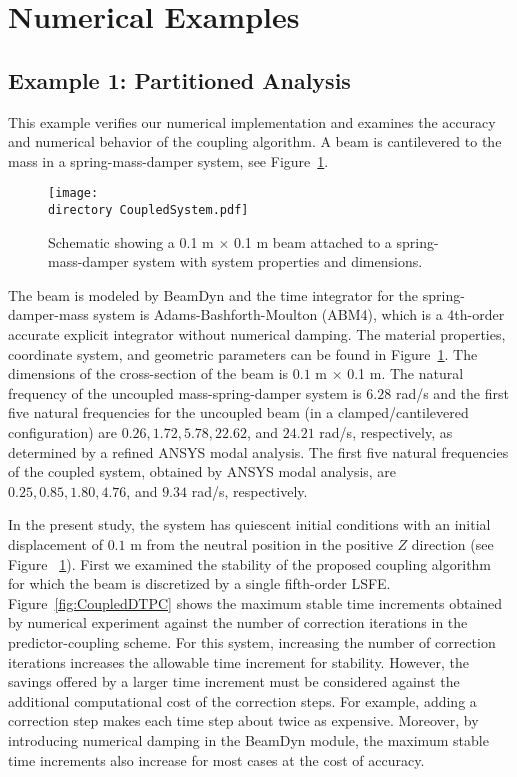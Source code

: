 \documentclass{aiaa-tc}
\def\directory{EPSF/}
\begin{document}
 
\section{Numerical Examples}
 
\subsection{Example 1: Partitioned Analysis}

This example verifies our numerical implementation and examines the accuracy and numerical behavior of the coupling algorithm. A beam is cantilevered to the mass in a spring-mass-damper system, 
see Figure~\ref{fig:CoupledSystem}. 

 \begin{figure}
\centering
\texttt{[image: \\directory CoupledSystem.pdf]}
\caption{Schematic showing a 0.1 m $\times$ 0.1 m beam attached to a spring-mass-damper system with system properties and dimensions.} 
\label{fig:CoupledSystem}
\end{figure}

The beam is modeled by BeamDyn and the time integrator for the spring-damper-mass system is Adams-Bashforth-Moulton (ABM4), which is a 4th-order accurate explicit integrator without numerical damping. 
The material properties, coordinate system, and geometric parameters can be found in Figure~\ref{fig:CoupledSystem}. 
The dimensions of the cross-section of the beam is $0.1$ m $\times$ 0.1 m. 
The natural frequency of the uncoupled mass-spring-damper system is $6.28$ rad/s and the first five natural frequencies for the uncoupled beam (in a clamped/cantilevered configuration) are $0.26, 1.72, 5.78, 22.62$, and $24.21$ rad/s, respectively, as determined by a refined ANSYS modal analysis. 
The first five natural frequencies of the coupled system, obtained by ANSYS modal analysis, are $0.25, 0.85, 1.80, 4.76$, and $9.34$ rad/s, respectively.
 
In the present study, the system has quiescent initial conditions with an initial displacement of $0.1$ m from the neutral position in the positive $Z$ direction (see Figure ~\ref{fig:CoupledSystem}). 
First we examined the stability of the proposed coupling algorithm for which the beam is discretized by a single fifth-order LSFE. 
Figure~\ref{fig:CoupledDTPC} shows the maximum stable time increments obtained by numerical experiment against the number of correction iterations in the predictor-coupling scheme.  
For this system, increasing the number of correction iterations increases the allowable time increment for stability.  However, the savings offered by a larger time increment must be considered against the additional computational cost of the correction steps.  For example, adding a correction step makes each time step about twice as expensive.
Moreover, by introducing numerical damping in the BeamDyn module, the maximum stable time increments also increase for most cases at the cost of accuracy.\cite{Bauchau:2010}
\end{document}

